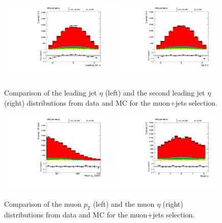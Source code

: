 \begin{figure}[h!t]
  {\centering
    \includegraphics[width=0.49\textwidth]{figs/n-1_plots_mu/mu_jetld_eta.pdf}
    \includegraphics[width=0.49\textwidth]{figs/n-1_plots_mu/mu_jetnt_eta.pdf}
    \caption{Comparison of the leading jet $\eta $ (left) and the
    second leading jet $\eta $ (right) distributions from data and MC
    for the muon+jets selection. }
\label{fig:mu_jet_eta}}
\end{figure}
\begin{figure}[h!t]
  {\centering
    \includegraphics[width=0.49\textwidth]{figs/n-1_plots_mu/mu_W_muon_pt.pdf}
    \includegraphics[width=0.49\textwidth]{figs/n-1_plots_mu/mu_W_muon_eta.pdf}
    \caption{Comparison of the muon $p_{T} $ (left) and the muon
      $\eta $ (right) distributions from data and MC for the muon+jets selection.
      }
    \label{fig:mu_muon}}
\end{figure}
